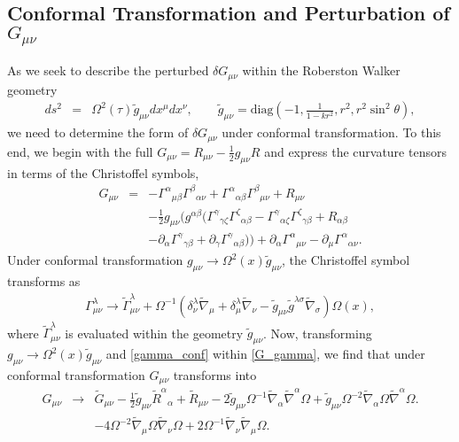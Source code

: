 \subsection{Conformal Transformation and Perturbation of $G_{\mu\nu}$}
As we seek to describe the perturbed $\delta G_{\mu\nu}$ within the Roberston Walker geometry
\begin{eqnarray}
ds^2 &=& \Omega^2(\tau)\tilde g_{\mu\nu} dx^\mu dx^\nu,\qquad 
\tilde g_{\mu\nu} = \text{diag}\left(-1,\frac{1}{1-kr^2},r^2,r^2\sin^2\theta\right),
\label{ac_rw_metric}
\end{eqnarray}
we need to determine the form of $\delta G_{\mu\nu}$ under conformal transformation. To this end, we begin with the full $G_{\mu\nu} = R_{\mu\nu} - \tfrac12 g_{\mu\nu} R$ and express the curvature tensors in terms of the Christoffel symbols,
\begin{eqnarray}
G_{\mu\nu} &=& - \Gamma^{\alpha }{}_{\mu \beta } \Gamma^{\beta }{}_{\alpha \nu } + \Gamma^{\alpha }{}_{\alpha \beta } \Gamma^{\beta }{}_{\mu \nu } + R_{\mu \nu } \nonumber \\ 
&& -  \tfrac{1}{2} g_{\mu \nu } \bigl(g^{\alpha \beta } (\Gamma^{\gamma }{}_{\gamma \zeta } \Gamma^{\zeta }{}_{\alpha \beta } -  \Gamma^{\gamma }{}_{\alpha \zeta } \Gamma^{\zeta }{}_{\gamma \beta } + R_{\alpha \beta }
\nonumber\\
&& -  \partial_{\alpha }\Gamma^{\gamma }{}_{\gamma \beta } + \partial_{\gamma }\Gamma^{\gamma }{}_{\alpha \beta })\bigr) + \partial_{\alpha }\Gamma^{\alpha }{}_{\mu \nu } -  \partial_{\mu }\Gamma^{\alpha }{}_{\alpha \nu }.
\label{G_gamma}
\end{eqnarray}
Under conformal transformation $g_{\mu\nu} \to \Omega^2(x)\tilde g_{\mu\nu}$, the Christoffel symbol transforms as
\begin{eqnarray}
\Gamma^{\lambda}_{\mu\nu} \to \tilde\Gamma^{\lambda}_{\mu\nu} + \Omega^{-1}(\delta^\lambda_\nu \tilde \nabla_\mu + \delta^\lambda_\mu \tilde\nabla_\nu - \tilde g_{\mu\nu}  \tilde g^{\lambda\sigma}\tilde \nabla_\sigma)\Omega(x),
\label{gamma_conf}
\end{eqnarray}
where $\tilde \Gamma^\lambda_{\mu\nu}$ is evaluated within the geometry $\tilde g_{\mu\nu}$. Now, transforming $g_{\mu\nu} \to \Omega^2(x)\tilde g_{\mu\nu}$ and \eqref{gamma_conf} within \eqref{G_gamma}, we find that under conformal transformation $G_{\mu\nu}$ transforms into
\begin{eqnarray}
G_{\mu\nu} &\to& \tilde G_{\mu\nu} - \tfrac{1}{2} \tilde g_{\mu \nu } \tilde R^{\alpha }{}_{\alpha } + \tilde R_{\mu \nu } - 2 \tilde g_{\mu \nu } \Omega^{-1} \tilde \nabla_{\alpha }\tilde \nabla^{\alpha }\Omega + \tilde g_{\mu \nu } \Omega^{-2} \tilde \nabla_{\alpha }\Omega \tilde\nabla^{\alpha }\Omega. 
\nonumber\\
 &&- 4 \Omega^{-2} \tilde \nabla_{\mu }\Omega \tilde\nabla_{\nu }\Omega + 2 \Omega^{-1} \tilde \nabla_{\nu }\tilde \nabla_{\mu }\Omega .
\end{eqnarray}
